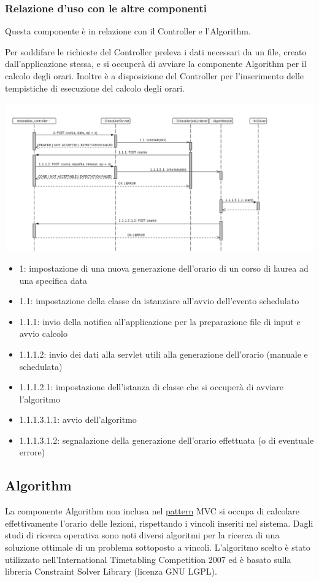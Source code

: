 \documentclass[11pt,a4paper]{article}
\begin{document}
\subsubsection{Relazione d'uso con le altre componenti}
Questa componente è in relazione con il Controller e l'Algorithm. 

Per soddifare le richieste del Controller preleva i dati necessari da un file, creato dall'applicazione stessa, e si occuperà di avviare la componente Algorithm per il calcolo degli orari.
Inoltre è a disposizione del Controller per l'inserimento delle tempistiche di esecuzione del calcolo degli orari.

\includegraphics[scale=0.3]{images/MiddleMan_sequence_diagram.png}
\begin{itemize}
\item 1: impostazione di una nuova generazione dell'orario di un corso di laurea ad una specifica data
\item 1.1: impostazione della classe da istanziare all'avvio dell'evento schedulato
\item 1.1.1: invio della notifica all'applicazione per la preparazione file di input e avvio calcolo
\item 1.1.1.2: invio dei dati alla servlet utili alla generazione dell'orario (manuale e schedulata)
\item 1.1.1.2.1: impostazione dell'istanza di classe che si occuperà di avviare l'algoritmo
\item 1.1.1.3.1.1: avvio dell'algoritmo
\item 1.1.1.3.1.2: segnalazione della generazione dell'orario effettuata (o di eventuale errore)	
\end{itemize}

\subsection{Algorithm}
La componente Algorithm non inclusa nel \underline{pattern} MVC si occupa di calcolare effettivamente l'orario delle lezioni, rispettando i vincoli inseriti nel sistema. Dagli studi di ricerca operativa sono noti diversi algoritmi per la ricerca di una soluzione ottimale di un problema sottoposto a vincoli. L'algoritmo scelto è stato utilizzato nell'International Timetabling Competition 2007 ed è basato sulla libreria Constraint Solver Library (licenza GNU LGPL).
\end{document}

